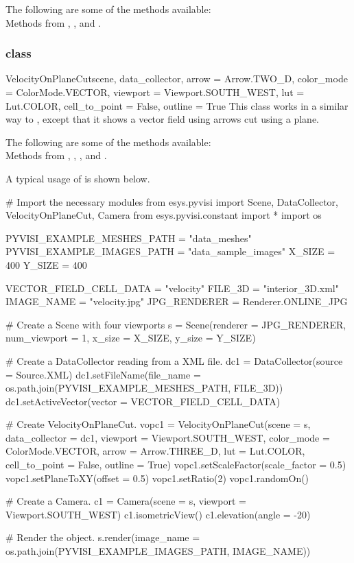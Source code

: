 The following are some of the methods available:\\
Methods from \ActorThreeD, \GlyphThreeD, \MaskPoints and \DataSetMapper. 

\subsubsection{\VelocityOnPlaneCut class}

\begin{classdesc}{VelocityOnPlaneCut}{scene, data_collector,
arrow = Arrow.TWO_D, color_mode = ColorMode.VECTOR, 
viewport = Viewport.SOUTH_WEST, lut = Lut.COLOR, 
cell_to_point = False, outline = True}
This class works in a similar way to \MapOnPlaneCut, except that 
it shows a vector field using arrows cut using a plane.
\end{classdesc}

The following are some of the methods available:\\
Methods from \ActorThreeD, \GlyphThreeD, \Transform, \MaskPoints and 
\DataSetMapper. 

A typical usage of \VelocityOnPlaneCut is shown below.

\begin{python}
# Import the necessary modules
from esys.pyvisi import Scene, DataCollector, VelocityOnPlaneCut, Camera
from esys.pyvisi.constant import *
import os

PYVISI_EXAMPLE_MESHES_PATH = "data_meshes"
PYVISI_EXAMPLE_IMAGES_PATH = "data_sample_images"
X_SIZE = 400
Y_SIZE = 400

VECTOR_FIELD_CELL_DATA = "velocity"
FILE_3D = "interior_3D.xml"
IMAGE_NAME = "velocity.jpg"
JPG_RENDERER = Renderer.ONLINE_JPG

# Create a Scene with four viewports
s = Scene(renderer = JPG_RENDERER, num_viewport = 1, x_size = X_SIZE, 
        y_size = Y_SIZE)

# Create a DataCollector reading from a XML file.
dc1 = DataCollector(source = Source.XML)
dc1.setFileName(file_name = os.path.join(PYVISI_EXAMPLE_MESHES_PATH, FILE_3D))
dc1.setActiveVector(vector = VECTOR_FIELD_CELL_DATA)

# Create VelocityOnPlaneCut.
vopc1 = VelocityOnPlaneCut(scene = s, data_collector = dc1, 
        viewport = Viewport.SOUTH_WEST, color_mode = ColorMode.VECTOR, 
        arrow = Arrow.THREE_D, lut = Lut.COLOR, cell_to_point = False, 
        outline = True)
vopc1.setScaleFactor(scale_factor = 0.5)
vopc1.setPlaneToXY(offset = 0.5)
vopc1.setRatio(2)
vopc1.randomOn()

# Create a Camera.
c1 = Camera(scene = s, viewport = Viewport.SOUTH_WEST)
c1.isometricView()
c1.elevation(angle = -20)

# Render the object.
s.render(image_name = os.path.join(PYVISI_EXAMPLE_IMAGES_PATH, IMAGE_NAME))
\end{python}

